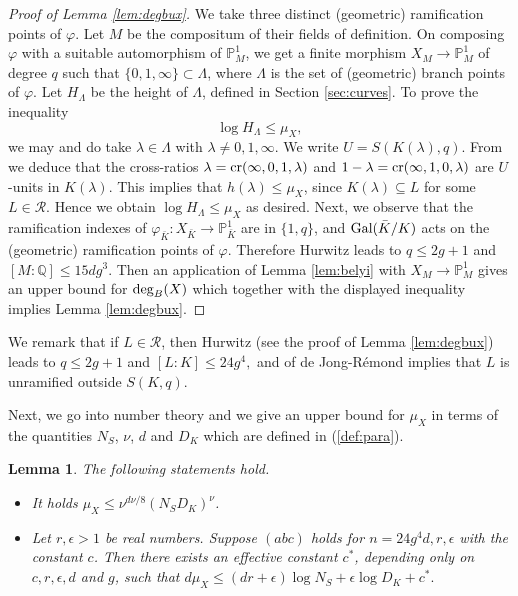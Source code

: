 \documentclass[11pt]{article}
\newtheorem{lemma}[theorem]{Lemma}
\numberwithin{equation}{section}
\def\deg{\textnormal{deg}}
\newcommand {\QQ}  {{\mathbb Q}}
\newcommand {\br} {\lambda}
\newcommand {\Br} {\Lambda}
\newcommand {\bk} {\bar{K}}
\begin{document}
\begin{proof}[Proof of Lemma \ref{lem:degbux}] 
We take three distinct (geometric) ramification points of $\varphi$. Let $M$ be the compositum of their fields of definition. On composing $\varphi$ with a suitable automorphism of  $\mathbb P^1_{M}$,
we get a finite morphism $X_{M}\to \mathbb P^1_{M}$ of degree $q$ such that $\{0,1,\infty\}\subset\Br$, where $\Br$ is the set of (geometric) branch points of $\varphi$. Let $H_\Lambda$ be the height of $\Br$, defined in  Section \ref{sec:curves}. To prove the inequality
$$
\log H_\Br\leq \mu_X,
$$
we may and do take $\br\in\Br$ with $\lambda\neq 0,1,\infty$. We write $U=S(K(\lambda),q)$. 
From \cite[Proposition 2.1]{jore:shafarevich} we deduce that the cross-ratios $\br=\textnormal{cr}(\infty,0,1,\br)$ and $1-\lambda=\textnormal{cr}(\infty,1,0,\br)$  are $U$-units in $K(\lambda)$. 
This implies that $h(\br)\leq \mu_X$, since $K(\lambda)\subseteq L$ for some $L\in\mathcal R$. Hence we obtain $\log H_\Br\leq \mu_X$ as desired.
Next, we observe that the ramification indexes of  $\varphi_{\bar{K}}:X_{\bk}\to \mathbb P^1_{\bk}$  are in $\{1,q\}$, and  $\textnormal{Gal}(\bk/K)$ acts on the (geometric) ramification points of $\varphi$.
Therefore  Hurwitz leads to $q\leq 2g+1$ and $[M:\QQ]\leq 15dg^3$. Then an application of Lemma \ref{lem:belyi} with $X_{M}\to \mathbb P^1_{M}$ gives an upper bound for $\deg_B(X)$ which together with the displayed inequality implies Lemma \ref{lem:degbux}.
\end{proof}

We remark that if $L\in\mathcal R$, then  Hurwitz (see the proof of Lemma \ref{lem:degbux}) leads to 
$q\leq 2g+1$ and $[L:K]\leq 24g^4,$
and \cite[Lemme 2.1]{jore:shafarevich} of de Jong-R\'emond implies that $L$ is unramified outside $S(K,q)$.


Next, we go into number theory and we give an upper bound for $\mu_X$ in terms of the  quantities $N_S$, $\nu$, $d$ and $D_K$ which are defined in (\ref{def:para}).
\begin{lemma}\label{lem:ux}
The following statements hold.
\begin{itemize}
\item[(i)] It holds $\mu_X\leq \nu^{d\nu/8}(N_SD_K)^{\nu}$.
\item[(ii)]  Let $r,\epsilon>1$ be real numbers. Suppose $(abc)$ holds for $n=24g^4d,r,\epsilon$ with the constant $c$. Then there exists an effective constant $c^*$, depending only on $c,r,\epsilon,d$ and $g$, such that $d\mu_{X}\leq  (dr+\epsilon)\log N_S+\epsilon\log D_K+c^*.$
\end{itemize}
\end{lemma}  
\end{document}
